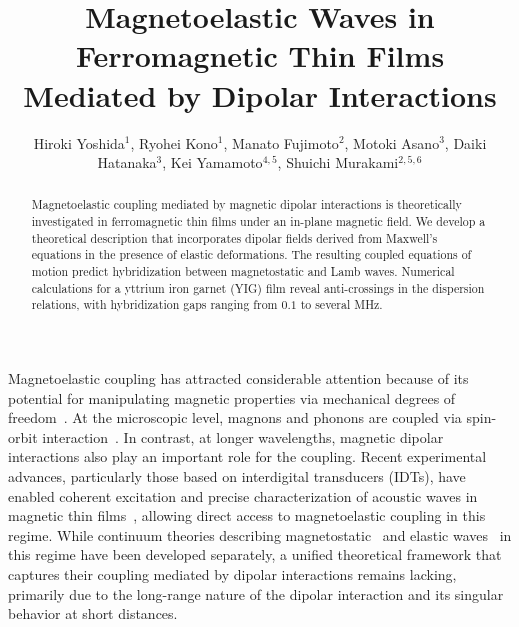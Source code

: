\documentclass[10pt]{iopart}
\begin{document}
\title{Magnetoelastic Waves in Ferromagnetic Thin Films Mediated by Dipolar Interactions}

\author{Hiroki Yoshida$^1$, Ryohei Kono$^1$, Manato Fujimoto$^2$, Motoki Asano$^3$, Daiki Hatanaka$^3$, Kei Yamamoto$^{4,5}$, Shuichi Murakami$^{2,5,6}$}
\address{$^1$ Department of Physics, Institute of Science Tokyo, 2-12-1 Ookayama, Meguro-ku, Tokyo 152-8551, Japan}
\address{$^2$ Department of Applied Physics, The University of Tokyo, 7-3-1 Hongo, Bunkyo-ku, Tokyo 113-8656, Japan}
\address{$^3$ Basic Research Laboratories, NTT, Inc., 3-1 Morinosato-Wakamiya, Atsugi-shi, Kanagawa 243-0198, Japan}
\address{$^4$ Advanced Science Research Center, Japan Atomic Energy Agency, Tokai, Ibaraki 319-1195, Japan}
\address{$^5$ Center for Emergent Matter Science, RIKEN, 2-1 Hirosawa, Wako, Saitama 351-0198, Japan}
\address{$^6$ International Institute for Sustainability with Knotted Chiral Meta Matter (WPI-SKCM$^2$), Hiroshima University, Higashi-hiroshima, Hiroshima 739-0046, Japan}


\begin{abstract}
    Magnetoelastic coupling mediated by magnetic dipolar interactions is theoretically investigated in ferromagnetic thin films under an in-plane magnetic field. We develop a theoretical description that incorporates dipolar fields derived from Maxwell's equations in the presence of elastic deformations. The resulting coupled equations of motion predict hybridization between magnetostatic and Lamb waves. Numerical calculations for a yttrium iron garnet (YIG) film reveal anti-crossings in the dispersion relations, with hybridization gaps ranging from $0.1$ to several MHz.
\end{abstract}

\submitto{\JJAP}
\maketitle
\ioptwocol

Magnetoelastic coupling has attracted considerable attention because of its potential for manipulating magnetic properties via mechanical degrees of freedom~\cite{Kittel_PR,LL_EDinCM}. At the microscopic level, magnons and phonons are coupled via spin-orbit interaction~\cite{Kittel_PR,Kittel_Abraham_RMP,Flebus_magnonPolaron}. In contrast, at longer wavelengths, magnetic dipolar interactions also play an important role for the coupling. Recent experimental advances, particularly those based on interdigital transducers (IDTs), have enabled coherent excitation and precise characterization of acoustic waves in magnetic thin films~\cite{IDT_review,Kunstle2025}, allowing direct access to magnetoelastic coupling in this regime. While continuum theories describing magnetostatic~\cite{Walker1957,damoneshbachMagnetostaticModesFerromagnet1961,damonPropagationMagnetostaticSpin} and elastic waves~\cite{Rayleigh1885,Rayleigh1889,Lamb1889,lambWavesElasticPlate1917} in this regime have been developed separately, a unified theoretical framework that captures their coupling mediated by dipolar interactions remains lacking, primarily due to the long-range nature of the dipolar interaction and its singular behavior at short distances.
\end{document}
